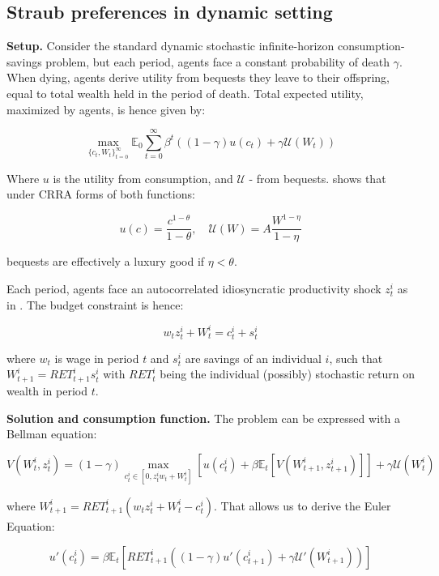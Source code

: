 \documentclass[12pt]{article}
\begin{document}
\subsection{Straub preferences in dynamic setting}
\label{subsec:simple_model}

\textbf{Setup.} Consider the standard dynamic stochastic infinite-horizon consumption-savings problem, but each period, agents face a constant probability of death $\gamma$. When dying, agents derive utility from bequests they leave to their offspring, equal to total wealth held in the period of death. Total expected utility, maximized by agents, is hence given by:

\[
\max_{\{c_t, W_t\}_{t=0}^{\infty}} \mathbb{E}_0 \sum_{t=0}^{\infty} \beta^t \left( (1-\gamma)u(c_t) +  \gamma \mathcal{U} \left( W_t \right)\right)
\]

Where $u$ is the utility from consumption, and $\mathcal{U}$ - from bequests. \textcite{straub2019} shows that under CRRA  forms of both functions:

\[
u(c) = \frac{c^{1 - \theta}}{1 - \theta}, \quad
\mathcal{U}(W) = A \frac{W^{1 - \eta}}{1 - \eta}
\]

bequests are effectively a luxury good if $\eta<\theta$.

Each period, agents face an autocorrelated idiosyncratic productivity shock $z_t^i$ as in \textcite{aiyagari1994}. The budget constraint is hence:

\[
w_t z_t^i + W_t^i = c_t^i + s_t^i
\]

where $w_t$ is wage in period $t$ and $s_t^i$ are savings of an individual $i$, such that $W_{t+1}^i = RET_{t+1}^i s_t^i$ with $RET_t^i$ being the individual (possibly) stochastic return on wealth in period $t$.

\textbf{Solution and consumption function.} The problem can be expressed with a Bellman equation:

\[
V\left(W_t^i, z_t^i\right) = (1 - \gamma) 
\max_{c_t^i \in [0,z_t^i w_t+W_t^i]} 
\left[ 
    u(c_t^i) 
    + \beta \mathbb{E}_t \left[
        V\left(W_{t+1}^i, z_{t+1}^i
        \right)
    \right]
\right]
+ \gamma \mathcal{U}(W_t^i)
\]

where $W_{t+1}^i = RET_{t+1}^i (w_t z_t^i + W_t^i - c_t^i)$. That allows us to derive the Euler Equation:

\[
u'(c_t^i) = \beta \mathbb{E}_t \left[ RET_{t+1}^{i} \left( (1 - \gamma) u'\left(c_{t+1}^{i}\right) + \gamma \mathcal{U}'\left(W_{t+1}^{i}\right) \right) \right]
\]
\end{document}
